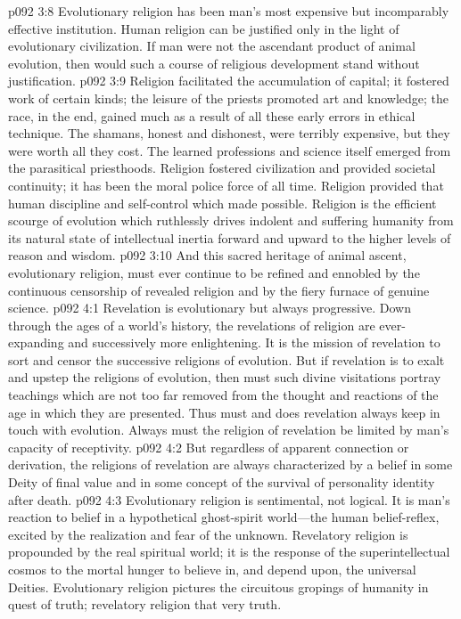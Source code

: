 \pc \vs p092 3:8 Evolutionary religion has been man’s most expensive but incomparably effective institution. Human religion can be justified only in the light of evolutionary civilization. If man were not the ascendant product of animal evolution, then would such a course of religious development stand without justification.
\pc \vs p092 3:9 Religion facilitated the accumulation of capital; it fostered work of certain kinds; the leisure of the priests promoted art and knowledge; the race, in the end, gained much as a result of all these early errors in ethical technique. The shamans, honest and dishonest, were terribly expensive, but they were worth all they cost. The learned professions and science itself emerged from the parasitical priesthoods. Religion fostered civilization and provided societal continuity; it has been the moral police force of all time. Religion provided that human discipline and self\hyp{}control which made  possible. Religion is the efficient scourge of evolution which ruthlessly drives indolent and suffering humanity from its natural state of intellectual inertia forward and upward to the higher levels of reason and wisdom.
\vs p092 3:10 And this sacred heritage of animal ascent, evolutionary religion, must ever continue to be refined and ennobled by the continuous censorship of revealed religion and by the fiery furnace of genuine science.\plusone
{}
\vs p092 4:1 Revelation is evolutionary but always progressive. Down through the ages of a world’s history, the revelations of religion are ever\hyp{}expanding and successively more enlightening. It is the mission of revelation to sort and censor the successive religions of evolution. But if revelation is to exalt and upstep the religions of evolution, then must such divine visitations portray teachings which are not too far removed from the thought and reactions of the age in which they are presented. Thus must and does revelation always keep in touch with evolution. Always must the religion of revelation be limited by man’s capacity of receptivity.
\vs p092 4:2 But regardless of apparent connection or derivation, the religions of revelation are always characterized by a belief in some Deity of final value and in some concept of the survival of personality identity after death.
\vs p092 4:3 Evolutionary religion is sentimental, not logical. It is man’s reaction to belief in a hypothetical ghost\hyp{}spirit world---the human belief\hyp{}reflex, excited by the realization and fear of the unknown. Revelatory religion is propounded by the real spiritual world; it is the response of the superintellectual cosmos to the mortal hunger to believe in, and depend upon, the universal Deities. Evolutionary religion pictures the circuitous gropings of humanity in quest of truth; revelatory religion  that very truth.

